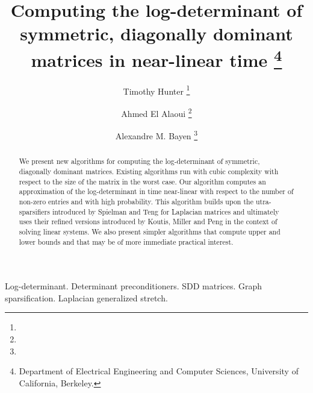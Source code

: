 \documentclass[11pt,onefignum,onetabnum]{siamltex}
\title{Computing the log-determinant of symmetric, diagonally dominant matrices
in near-linear time \thanks{Department of Electrical Engineering and Computer Sciences, University of California, Berkeley.}}
\author{Timothy Hunter \thanks{\email{tjhunter@eecs.berkeley.edu}}\and 
Ahmed {El Alaoui} \thanks{\email{elalaoui@eecs.berkeley.edu}}\and
Alexandre M. Bayen \thanks{\email{bayen@berkeley.edu}}}
\begin{document}
\maketitle
{}%

\begin{abstract}
We present new algorithms for computing the log-determinant of symmetric,
diagonally dominant matrices. Existing algorithms run with cubic complexity
with respect to the size of the matrix in the worst case. Our algorithm 
computes an approximation of the log-determinant in time near-linear with 
respect to the number of non-zero entries and with high probability. This 
algorithm builds upon the utra-sparsifiers introduced by Spielman and Teng for
Laplacian matrices and ultimately uses their refined versions introduced by Koutis, Miller and Peng in the context of solving linear systems. We also present simpler algorithms that compute upper and 
lower bounds and that may be of more immediate practical interest.
\end{abstract}

\begin{keywords}
Log-determinant.
Determinant preconditioners.
SDD matrices.
Graph sparsification.
Laplacian generalized stretch.
\end{keywords}

\begin{AMS}\end{AMS}


\pagestyle{myheadings}
% 
\thispagestyle{plain}
















% 
\end{document}
